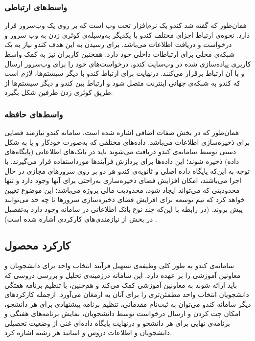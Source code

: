 \documentclass{report}
\begin{document}
\subsubsection{واسط‌های ارتباطی}
همان‌طور که گفته شد کندو یک نرم‌افزار تحت وب است که بر روی یک وب‌سرور قرار دارد. نحوه‌ی ارتباط اجزای مختلف کندو با یکدیگر به‌وسیله‌ی کوئری زدن به وب سرور و درخواست و دریافت اطلاعات می‌باشد. برای رسیدن به این هدف کندو نیاز به یک شبکه‌ی محلی برای ارتباطات داخلی خود دارد. همچنین کاربران نیز به کمک واسط کاربری پیاده‌سازی شده در وب‌سایت کندو، درخواست‌های خود را برای وب‌سرور ارسال و با آن ارتباط برقرار می‌کنند. درنهایت برای ارتباط کندو با دیگر سیستم‌ها، لازم است که کندو به شبکه‌ی جهانی اینترنت متصل شود و ارتباط بین کندو و دیگر سیستم‌ها از طریق کوئری زدن طرفین شکل بگیرد.
\subsubsection{واسط‌های حافظه}
همان‌طور که در بخش صفات اضافی اشاره شده است، سامانه کندو نیازمند فضایی برای ذخیره‌سازی اطلاعات می‌باشد. داده‌های مختلفی که به‌صورت خودکار و یا به شکل دستی توسط سامانه‌ی کندو دریافت می‌شوند باید در بانک‌های اطلاعاتی (پایگاه‌های داده) ذخیره شوند؛ این داده‌ها برای پردازش فرآیندها مورداستفاده قرار می‌گیرند. با توجه به این‌که پایگاه داده اصلی و ثانویه‌ی کندو هر دو بر روی سرورهای مجازی در حال اجرا می‌باشند، امکان افزایش فضای ذخیره‌سازی به‌راحتی برای آنها وجود دارد و تنها محدودیتی که می‌تواند ایجاد شود‌، محدودیت مالی پروژه می‌باشد؛ این موضوع تعیین خواهد کرد که تیم توسعه برای افزایش فضای ذخیره‌سازی سرورها تا چه حد می‌توانند پیش بروند. (در رابطه با این‌که چند نوع بانک اطلاعاتی در سامانه وجود دارد به‌تفصیل در بخش 
\hyperlink{ww}{\underline{}}
 از نیازمندی‌های کارکردی اشاره شده است) .
\subsection{کارکرد محصول}
سامانه‌ی کندو به طور کلی وظیفه‌ی تسهیل فرآیند انتخاب واحد برای دانشجویان و معاونین آموزشی را بر عهده دارد. این سامانه درزمینه‌ی تحلیل و بررسی دروسی که باید ارائه شوند به معاونین آموزشی کمک می‌کند و هم‌چنین، با تنظیم برنامه هفتگی دانشجویان انتخاب واحد مطمئن‌تری را برای آنان به ارمغان می‌آورد. ازجمله کارکردهای دیگر سامانه کندو می‌توان به ثبت‌نام مقدماتی، تنظیم برنامه پیشنهادی برای هر دانشجو، امکان چت کردن و ارسال درخواست توسط دانشجویان، نمایش برنامه‌های هفتگی و برنامه‌ی نهایی برای هر دانشجو و درنهایت پایگاه داده‌ای غنی از وضعیت تحصیلی دانشجویان و اطلاعات دروس و اساتید هر رشته اشاره کرد.
\end{document}
